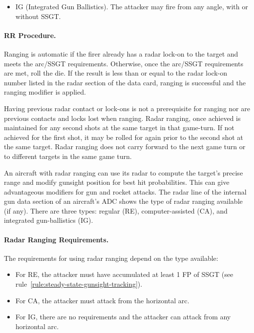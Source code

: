 \begin{advancedrules}
{\begin{itemize}
\item IG (Integrated Gun Ballistics). The attacker may fire from any angle, with or without SSGT.

\end{itemize}

\paragraph{RR Procedure.} Ranging is automatic if the firer already has a radar lock-on to the target and meets the arc/SSGT requirements. Otherwise, once the arc/SSGT requirements are met, roll the die. If the result is less than or equal to the radar lock-on number listed in the radar section of the data card, ranging is successful and the ranging modifier is applied.

Having previous radar contact or lock-ons is not a prerequisite for ranging nor are previous contacts and locks lost when ranging. Radar ranging, once achieved is maintained for any second shots at the same target in that game-turn. If not achieved for the first shot, it may be rolled for again prior to the second shot at the same target. Radar ranging does not carry forward to the next game turn or to different targets in the same game turn.
}{

An aircraft with radar ranging can use its radar to compute the target's precise range and modify gunsight position for best hit probabilities. This can give advantageous modifiers for gun and rocket attacks. The radar line of the internal gun data section of an aircraft's ADC shows the type of radar ranging available (if any). There are three types: regular (RE), computer-assisted (CA), and integrated gun-ballistics (IG).

\paragraph{Radar Ranging Requirements.} The requirements for using radar ranging depend on the type available:

\begin{itemize}

\item For RE, the attacker must have accumulated at least 1 FP of SSGT (see rule~\ref{rule:steady-state-gunsight-tracking}).

\item For CA, the attacker must attack from the  horizontal arc.

\item For IG, there are no requirements and the attacker can attack from any horizontal arc.


\end{itemize}}
\end{advancedrules}
